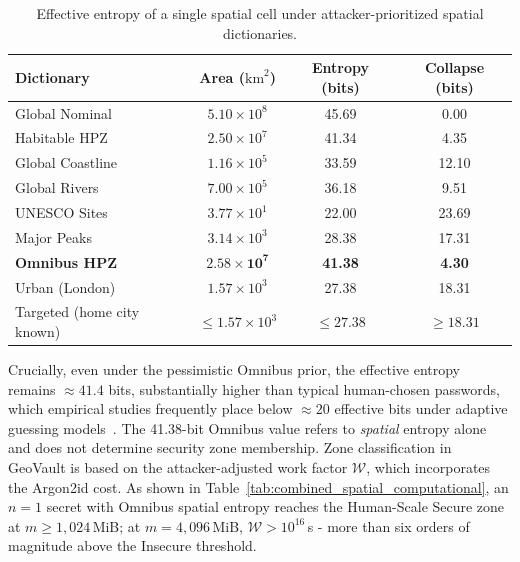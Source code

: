 \documentclass[journal,article,submit,pdftex,moreauthors]{Definitions/mdpi}
\newcommand{\add}[1]{#1}
\newcommand{\add}[1]{\added{#1}}
\begin{document}
\begin{table}[H]
\caption{Effective entropy of a single spatial cell under attacker-prioritized spatial dictionaries.}
\label{tab:entropy_dictionaries}
\centering
\begin{tabular}{lccc}
\toprule
\textbf{Dictionary} & \textbf{Area ($\text{km}^2$)} & \textbf{Entropy (bits)} & \textbf{Collapse (bits)} \\
\midrule
Global Nominal & $5.10\times10^{8}$ & 45.69 & 0.00 \\
Habitable HPZ & $2.50\times10^{7}$ & 41.34 & 4.35 \\
Global Coastline & $1.16\times10^{5}$ & 33.59 & 12.10 \\
Global Rivers & $7.00\times10^{5}$ & 36.18 & 9.51 \\
UNESCO Sites & $3.77\times10^{1}$ & 22.00 & 23.69 \\
Major Peaks & $3.14\times10^{3}$ & 28.38 & 17.31 \\
\textbf{Omnibus HPZ} & $\mathbf{2.58\times10^{7}}$ & \textbf{41.38} & \textbf{4.30} \\
Urban (London) & $1.57\times10^{3}$ & 27.38 & 18.31 \\
\add{Targeted (home city known)} & \add{$\le 1.57\times10^{3}$} & \add{$\le 27.38$} & \add{$\ge 18.31$} \\
\bottomrule
\end{tabular}
\end{table}

Crucially, even under the pessimistic Omnibus prior, the effective entropy remains $\approx 41.4$ bits, substantially higher than typical human-chosen passwords, which empirical studies frequently place below $\approx 20$ effective bits under adaptive guessing models~\cite{Bonneau2012}. \add{The 41.38-bit Omnibus value refers to \emph{spatial} entropy alone and does not determine security zone membership. Zone classification in GeoVault is based on the attacker-adjusted work factor $\mathcal{W}$, which incorporates the Argon2id cost. As shown in Table~\ref{tab:combined_spatial_computational}, an $n=1$ secret with Omnibus spatial entropy reaches the Human-Scale Secure zone at $m \geq 1{,}024$\,MiB; at $m=4{,}096$\,MiB, $\mathcal{W} > 10^{16}$\,s - more than six orders of magnitude above the Insecure threshold.}
\end{document}
